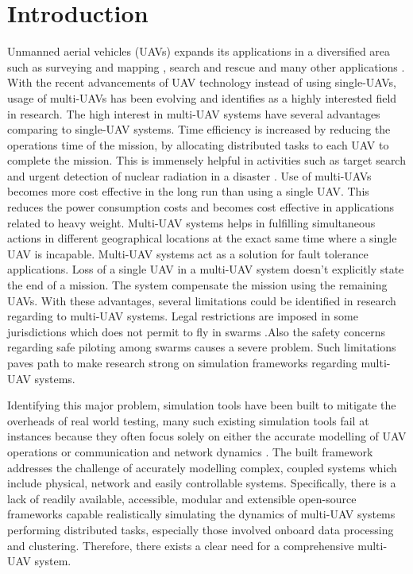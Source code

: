 \section{Introduction}

Unmanned aerial vehicles (UAVs) expands its applications in a diversified area such as surveying and mapping \cite{ref01}, search and rescue \cite{ref02} and many other applications \cite{ref03}. With the recent advancements of UAV technology instead of using single-UAVs, usage of multi-UAVs has been evolving and identifies as a highly interested field in research. The high interest in multi-UAV systems have several advantages comparing to single-UAV systems. Time efficiency is increased by reducing the operations time of the mission, by allocating distributed tasks to each UAV to complete the mission. This is immensely helpful in activities such as target search and urgent detection of nuclear radiation in a disaster \cite{ref03}. Use of multi-UAVs becomes more cost effective in the long run than using a single UAV. This reduces the power consumption costs and becomes cost effective in applications related to heavy weight. Multi-UAV systems helps in fulfilling simultaneous actions in different geographical locations at the exact same time where a single UAV is incapable. Multi-UAV systems act as a solution for fault tolerance applications. Loss of a single UAV in a multi-UAV system doesn't explicitly state the end of a mission. The system compensate the mission using the remaining UAVs. With these advantages, several limitations could be identified in research regarding to multi-UAV systems. Legal restrictions are imposed in some jurisdictions which does not permit to fly in swarms \cite{ref03}.Also the safety concerns regarding safe piloting among swarms causes a severe problem. Such limitations paves path to make research strong on simulation frameworks regarding multi-UAV systems.

Identifying this major problem, simulation tools have been built to mitigate the overheads of real world testing, many such existing simulation tools fail at instances because they often focus solely on either the accurate modelling of UAV operations \cite{drons3} or communication and network dynamics \cite{gazebons3}. The built framework addresses the challenge of accurately modelling complex, coupled systems which include physical, network and easily controllable systems. Specifically, there is a lack of readily available, accessible, modular and extensible open-source frameworks capable realistically simulating the dynamics of multi-UAV systems performing distributed tasks, especially those involved onboard data processing and clustering. Therefore, there exists a clear need for a comprehensive multi-UAV system.

